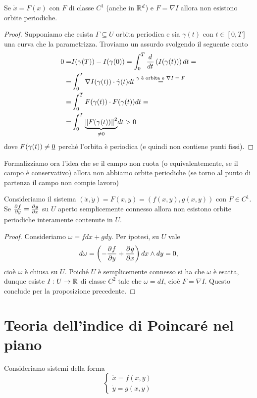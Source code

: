 \begin{proposition}\label{CriterioGradienteInesistenzaOrbitePeriodiche}
Se $\dot x=F(x)$ con $F$ di classe $C^1$ (anche in $\mathbb{R}^d$) e $F=\nabla I$ allora non esistono orbite periodiche.
\end{proposition}
\begin{proof}
Supponiamo che esista $\Gamma\subseteq U$ orbita periodica e sia $\gamma(t)$ con $t\in [0,T]$ una curva che la parametrizza. Troviamo un assurdo svolgendo il seguente conto
\begin{align*}
0=&I(\gamma(T))-I(\gamma(0))=\int_0^T \dd t{}\pa{I(\gamma(t))}dt=\\
=&\int_0^T \nabla I(\gamma(t))\cdot \dot \gamma(t) dt\pasgnl={$\gamma$ \`e orbita e $\nabla I=F$}\\
=&\int_0^T F(\gamma(t))\cdot F(\gamma(t)) dt=\\
=&\int_0^T \under{\neq 0}{\norm{F(\gamma(t))}^2} dt>0
\end{align*}
dove $F(\gamma(t))\neq \underline{0}$ perch\'e l'orbita \`e periodica (e quindi non contiene punti fissi).
\end{proof}

\noindent Formalizziamo ora l'idea che se il campo non ruota (o equivalentemente, se il campo \`e conservativo) allora non abbiamo orbite periodiche (se torno al punto di partenza il campo non compie lavoro)
\begin{proposition}\label{MetodoRotore}
Consideriamo il sistema $(\dot x,\dot y)=F(x,y)=(f(x,y),g(x,y))$ con $F\in C^1$. Se $\pp yf=\pp xg$ su $U$ aperto semplicemente connesso allora non esistono orbite periodiche interamente contenute in $U$.
\end{proposition}
\begin{proof}
Consideriamo $\omega=f dx+gdy$. Per ipotesi, su $U$ vale
\[d\omega=\pa{-\pp yf+\pp xg}dx\wedge dy=0,\]
cio\`e $\omega$ \`e chiusa su $U$. Poich\'e $U$ \`e semplicemente connesso si ha che $\omega$ \`e esatta, dunque esiste $I:U\to \mathbb{R}$ di classe $C^2$ tale che $\omega=dI$, cio\`e $F=\nabla I$. Questo conclude per la proposizione precedente.
\end{proof}


\section{Teoria dell'indice di Poincar\'e nel piano}
Consideriamo sistemi della forma
\[\begin{cases}
\dot x=f(x,y)\\
\dot y=g(x,y)
\end{cases}\]

